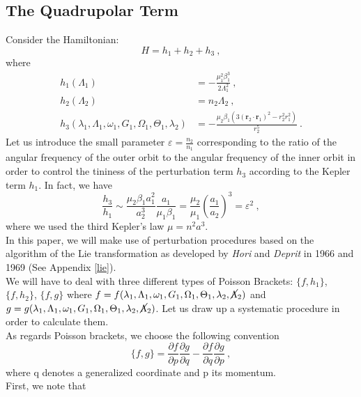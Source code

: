 \documentclass[a4paper]{article}
\begin{document}
\subsection{The Quadrupolar Term}
Consider the Hamiltonian: \[H=h_{1}+h_{2}+h_{3} \ ,\]
where 
\begin{align}
\label{h1}
h_{1}(\Lambda_{1})&=-\frac{\mu_{1}^{2}\beta_{1}^{3}}{2\Lambda_{1}^{2}} \ , \\
\label{h2}
h_{2}(\Lambda_{2})&=n_{2}\Lambda_{2} \ , \\
\label{h3}
h_{3}(\lambda_{1},\Lambda_{1},\omega_{1},G_{1},\Omega_{1},\Theta_{1},\lambda_{2})&=-\frac{\mu_{2}\beta_{1}(3(\mathbf r_{2} \cdot \mathbf r_{1})^{2}-r_{2}^{2}r_{1}^{2})}{r_{2}^{5}} \ .
\end{align}
Let us introduce the small parameter $\varepsilon=\frac{n_{2}}{n_{1}}$ corresponding to the ratio of the angular frequency of the outer orbit to the angular frequency of the inner orbit in order to control the tininess of the perturbation term $h_{3}$ according to the Kepler term $h_{1}$. In fact, we have 
\begin{equation}
\frac{h_{3}}{h_{1}} \sim \frac{\mu_{2}\beta_{1}a_{1}^{2}}{a_{2}^{3}} \frac{a_{1}}{\mu_{1}\beta_{1}}
=\frac{\mu_{2}}{\mu_{1}} \left(\frac{a_{1}}{a_{2}}\right)^{3}=\varepsilon^{2} \ ,
\label{h3eps}
\end{equation}
where we used the third Kepler's law $\mu=n^{2}a^{3}$. \\
In this paper, we will make use of perturbation procedures based on the algorithm of the Lie transformation as developed by \textit{Hori} and \textit{Deprit} in 1966 and 1969 (See Appendix \ref{lie}). \\
 We will have to deal with three different types of Poisson Brackets: $\{f,h_{1}\}$, $\{f,h_{2}\}$, $\{f,g\}$ where $f=f(\lambda_{1},\Lambda_{1},\omega_{1},G_{1},\Omega_{1},\Theta_{1},\lambda_{2},\cancel \Lambda_{2})$ and $g=g(\lambda_{1},\Lambda_{1},\omega_{1},G_{1},\Omega_{1},\Theta_{1},\lambda_{2}, \cancel \Lambda_{2})$. 
 Let us draw up a systematic procedure in order to calculate them. \\
 As regards Poisson brackets, we choose the following convention 
 \begin{equation}
 \{f, g\} = \frac{\partial f}{\partial p}\frac{\partial g}{\partial q} - \frac{\partial f}{\partial q}\frac{\partial g}{\partial p} \ ,
 \end{equation}
 where q denotes a generalized coordinate and p its momentum. \\
First, we note that
\end{document}
